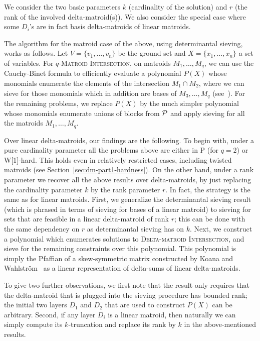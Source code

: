We consider the two basic parameters $k$ (cardinality of the solution)
and $r$ (the rank of the involved delta-matroid(s)). We also consider
the special case where some $D_i$'s are in fact basis
delta-matroids of linear matroids.

The algorithm for the matroid case of the above, using determinantal
sieving, works as follows. Let $V=\{v_1,\ldots,v_n\}$
be the ground set and $X=\{x_1,\ldots,x_n\}$ a set of variables. For
\textsc{$q$-Matroid Intersection}, on matroids $M_1, \ldots, M_q$,
we can use the Cauchy-Binet formula to efficiently evaluate a
polynomial $P(X)$ whose monomials enumerate the elements of the
intersection $M_1 \cap M_2$, where we can sieve for those monomials
which in addition are bases of $M_3, \ldots, M_q$ (see~\cite{EKW23}).
For the remaining problems, we replace $P(X)$ by the much simpler
polynomial whose monomials enumerate unions of blocks from $\mathcal P$
and apply sieving for all the matroids $M_1, \ldots, M_q$.

Over linear delta-matroids, our findings are the following. To begin
with, under a pure cardinality parameter all the problems above are
either in P (for $q=2$) or W[1]-hard. This holds even in relatively
restricted cases, including twisted matroids (see Section~\ref{sec:dm-part1-hardness}).
On the other hand, under a rank parameter we recover all the above
results over delta-matroids, by just replacing the cardinality parameter $k$
by the rank parameter $r$. In fact, the strategy is the same as for
linear matroids. First, we generalize the determinantal sieving result
(which is phrased in terms of sieving for bases of a linear matroid)
to sieving for sets that are feasible in a linear delta-matroid of
rank $r$; this can be done with the same dependency on $r$ as
determinantal sieving has on $k$. Next, we construct a polynomial
which enumerates solutions to \textsc{Delta-matroid Intersection},
and sieve for the remaining constraints over this polynomial.
This polynomial is simply the Pfaffian of a skew-symmetric matrix
constructed by Koana and Wahlström~\cite{KW24} as a linear
representation of delta-sums of linear delta-matroids.

To give two further observations, we first note that the result only
requires that the delta-matroid that is plugged into the sieving
procedure has bounded rank; the initial two layers $D_1$ and $D_2$
that are used to construct $P(X)$ can be arbitrary. Second, if any
layer $D_i$ is a linear matroid, then naturally we can simply compute
its $k$-truncation and replace its rank by $k$ in the above-mentioned
results.

